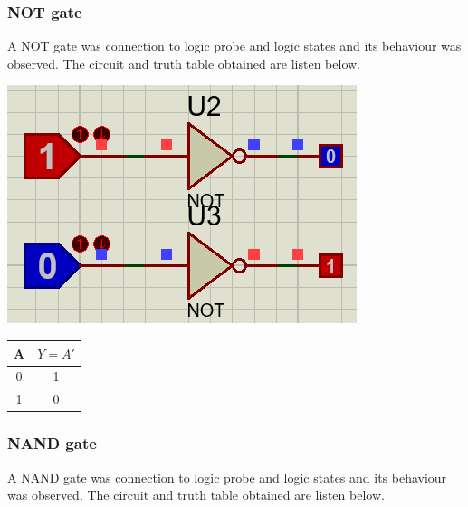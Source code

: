\documentclass[a4paper, 12pt]{article}
\begin{document}
\subsubsection{NOT gate}
A NOT gate was connection to logic probe and logic states and its behaviour was observed.
The circuit and truth table obtained are listen below. \\

\begin{minipage}[c]{.7\textwidth}
  \centering
  \includegraphics[scale=0.5]{not}
\end{minipage}
\begin{minipage}{.3\textwidth}
  \begin{center}
    \begin{tabular}{ |c|c| }
      \hline
      A &  $Y=A'$ \\
      \hline
      0 & 1 \\
      \hline
      1 & 0 \\
      \hline
    \end{tabular}
  \end{center}
\end{minipage}


\subsubsection{NAND gate}
A NAND gate was connection to logic probe and logic states and its behaviour was observed.
The circuit and truth table obtained are listen below. \\
\end{document}
